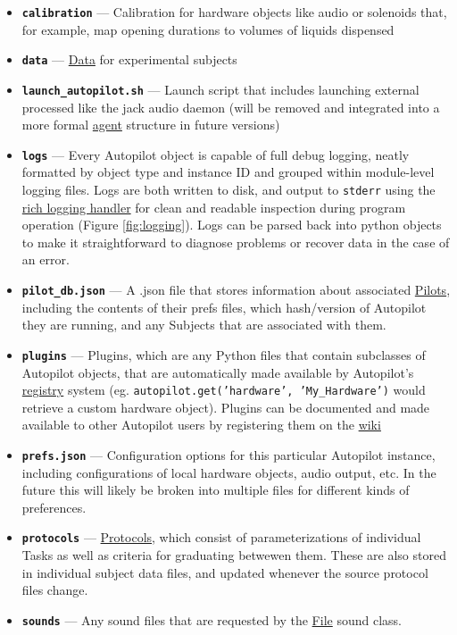 \begin{itemize}
\item \textbf{\texttt{calibration}} --- Calibration for hardware objects like audio or solenoids that, for example, map opening durations to volumes of liquids dispensed
\item \textbf{\texttt{data}} --- \hyperref[sec:datamodel]{Data} for experimental subjects
\item \textbf{\texttt{launch\_autopilot.sh}} --- Launch script that includes launching external processed like the jack audio daemon (will be removed and integrated into a more formal \hyperref[sec:agents]{agent} structure in future versions)
\item \textbf{\texttt{logs}} --- Every Autopilot object is capable of full debug logging, neatly formatted by object type and instance ID and grouped within module-level logging files. Logs are both written to disk, and output to \texttt{stderr} using the \href{https://rich.readthedocs.io/en/latest/reference/logging.html#logging}{rich logging handler} for clean and readable inspection during program operation (Figure \ref{fig:logging}). Logs can be parsed back into python objects to make it straightforward to diagnose problems or recover data in the case of an error.
\item \textbf{\texttt{pilot\_db.json}} --- A .json file that stores information about associated \hyperref[sec:agents]{Pilots}, including the contents of their prefs files, which hash/version of Autopilot they are running, and any Subjects that are associated with them.
\item \textbf{\texttt{plugins}} --- Plugins, which are any Python files that contain subclasses of Autopilot objects, that are automatically made available by Autopilot's \href{https://docs.auto-pi-lot.com/en/latest/utils/registry.html}{registry} system (eg. \texttt{autopilot.get('hardware', 'My_Hardware')} would retrieve a custom hardware object). Plugins can be documented and made available to other Autopilot users by registering them on the \href{https://wiki.auto-pi-lot.com/index.php/Autopilot_Plugins}{wiki}
\item \textbf{\texttt{prefs.json}} --- Configuration options for this particular Autopilot instance, including configurations of local hardware objects, audio output, etc. In the future this will likely be broken into multiple files for different kinds of preferences.
\item \textbf{\texttt{protocols}} --- \hyperref[sec:tasks]{Protocols}, which consist of parameterizations of individual Tasks as well as criteria for graduating betwewen them. These are also stored in individual subject data files, and updated whenever the source protocol files change.
\item \textbf{\texttt{sounds}} --- Any sound files that are requested by the \href{https://docs.auto-pi-lot.com/en/latest/stim/sound/sounds.html\#autopilot.stim.sound.sounds.File}{File} sound class.
\end{itemize}

